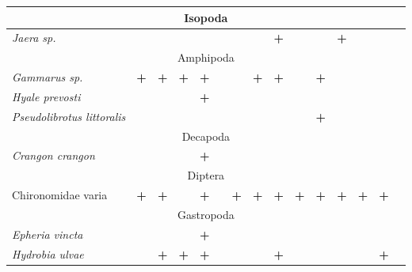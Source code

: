 \begin{footnotesize}
\begin{longtable}{|p{2.1cm}|p{0.38cm}p{0.38cm}|p{0.38cm}p{0.38cm}|p{0.38cm}p{0.38cm}|p{0.35cm}p{0.35cm}p{0.35cm}|p{1cm}|p{0.5cm}p{0.5cm}|p{1cm}|p{1cm}|}
\multicolumn{15}{|c|}{Isopoda} \\ \hline
{\it Jaera sp.}                 &           &           &           &           &           &           &          & \textbf{+}       &          &                 & \textbf{+}       &          &          &            \\ \hline
\multicolumn{15}{|c|}{Amphipoda} \\ \hline
{\it Gammarus sp.}              & \textbf{+}        & \textbf{+}        & \textbf{+}        & \textbf{+}        &           &           & \textbf{+}       & \textbf{+}       &          & \textbf{+}              &          &          &          &            \\  \hline
{\it Hyale prevosti}            &           &           &           & \textbf{+}        &           &           &          &          &          &                 &          &          &          &            \\  \hline
{\it Pseudolibrotus littoralis} &           &           &           &           &           &           &          &          &          & \textbf{+}              &          &          &          &            \\ \hline
\multicolumn{15}{|c|}{Decapoda} \\ \hline
{\it Crangon crangon}           &           &           &           & \textbf{+}        &           &           &          &          &          &                 &          &          &          &            \\ \hline
\multicolumn{15}{|c|}{Diptera} \\ \hline
Chironomidae varia        & \textbf{+}        & \textbf{+}        &           & \textbf{+}        &           & \textbf{+}        & \textbf{+}       & \textbf{+}       & \textbf{+}       & \textbf{+}              & \textbf{+}       & \textbf{+}       & \textbf{+}       &            \\ \hline
\multicolumn{15}{|c|}{Gastropoda} \\ \hline
{\it Epheria vincta}            &           &           &           & \textbf{+}        &           &           &          &          &          &                 &          &          &          &            \\  \hline
{\it Hydrobia ulvae}            &           & \textbf{+}        & \textbf{+}        & \textbf{+}        &           &           &          & \textbf{+}       &          &                 &          &          & \textbf{+}       &            \\  \hline

\end{longtable}
\end{footnotesize}
